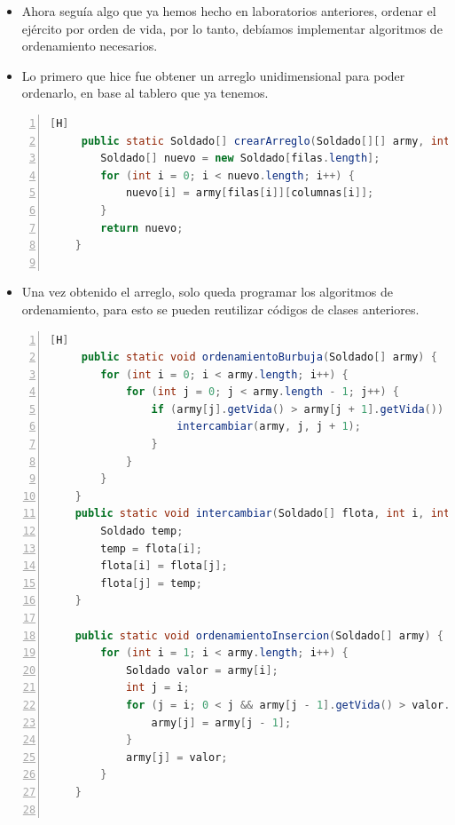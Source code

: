 \documentclass{article}
\begin{document}
	\begin{itemize}	
		\item Ahora seguía algo que ya hemos hecho en laboratorios anteriores, ordenar el ejército por orden de vida, por lo tanto, debíamos implementar algoritmos de ordenamiento necesarios.
		\item Lo primero que hice fue obtener un arreglo unidimensional para poder ordenarlo, en base al tablero que ya tenemos.
	\end{itemize}
	
	\begin{lstlisting}[language=java,caption={Obtener arreglo}, numbers=left][H]
	 public static Soldado[] crearArreglo(Soldado[][] army, int[] filas, int[] columnas) {
        Soldado[] nuevo = new Soldado[filas.length];
        for (int i = 0; i < nuevo.length; i++) {
            nuevo[i] = army[filas[i]][columnas[i]];
        }
        return nuevo;
    }
    
	\end{lstlisting}
	
	\begin{itemize}	
		\item Una vez obtenido el arreglo, solo queda programar los algoritmos de ordenamiento, para esto se pueden reutilizar códigos de clases anteriores.
	\end{itemize}
	
	\begin{lstlisting}[language=java,caption={Algoritmos de ordenamiento}, numbers=left][H]
	 public static void ordenamientoBurbuja(Soldado[] army) {
        for (int i = 0; i < army.length; i++) {
            for (int j = 0; j < army.length - 1; j++) {
                if (army[j].getVida() > army[j + 1].getVida()) {
                    intercambiar(army, j, j + 1);
                }
            }
        }
    }
    public static void intercambiar(Soldado[] flota, int i, int j) {
        Soldado temp;
        temp = flota[i];
        flota[i] = flota[j];
        flota[j] = temp;
    }

    public static void ordenamientoInsercion(Soldado[] army) {
        for (int i = 1; i < army.length; i++) {
            Soldado valor = army[i];
            int j = i;
            for (j = i; 0 < j && army[j - 1].getVida() > valor.getVida(); j--) {
                army[j] = army[j - 1];
            }
            army[j] = valor;
        }
    }
    
	\end{lstlisting}
	
\end{document}
